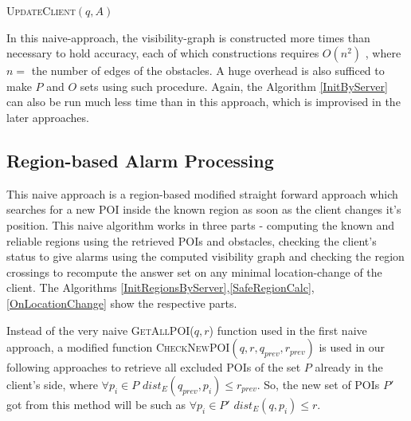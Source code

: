 \documentclass{sig-alternate}
\begin{document}
\begin{algorithm}
\caption{\textsc{UpdateClient}$(q, A)$}

    
	  {
	}
\label{UpdateClient}
\end{algorithm}


In this naive-approach, the visibility-graph is constructed more times than necessary to hold accuracy, each of which constructions requires $O(n^2)$ \cite{mur}, where $n =$ the number of edges of the obstacles. A huge overhead is also sufficed to make $P$ and $O$ sets using such procedure. Again, the Algorithm \ref{InitByServer} can also be run much less time than in this approach, which is improvised in the later approaches.


\subsection{Region-based Alarm Processing}
This naive approach is a region-based modified straight forward approach which searches for a new POI inside the known region as soon as the client changes it's position.
This naive algorithm works in three parts - computing the known and reliable regions using the retrieved POIs and obstacles, checking the client's status to give alarms using the computed visibility graph and checking the region crossings to recompute the answer set on any minimal location-change of the client. The Algorithms \ref{InitRegionsByServer},\ref{SafeRegionCalc},\ref{OnLocationChange} show the respective parts.

Instead of the very naive \textsc{GetAllPOI}($q, r$) function used in the first naive approach, a modified function \textsc{CheckNewPOI}$(q, r, q_{prev}, r_{prev})$ is used in our following approaches to retrieve all excluded POIs of the set $P$ already in the client's side, where $\forall p_i \in P$ $dist_E(q_{prev}, p_i) \leqslant r_{prev}$. So, the new set of POIs $P'$ got from this method will be such as $\forall p_i \in P'$ $dist_E(q, p_i) \leqslant r$. 
\end{document}
